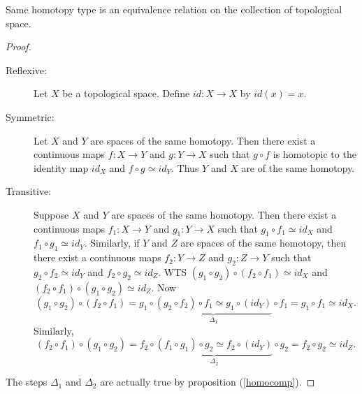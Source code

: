 \begin{prop}
Same homotopy type is an equivalence relation on the collection of topological space.
\end{prop}

\begin{proof}
\begin{description}
  \item[Reflexive:] Let $X$ be a topological space. Define $id:X\rightarrow X$ by $id(x)=x.$
  \item[Symmetric:] Let $X $ and $Y$ are spaces of the same homotopy. Then there exist a continuous maps $f:X\rightarrow Y$ and $g:Y\rightarrow X$ such that $g\circ f $ is homotopic to the identity map $id_X$ and $f\circ g\simeq id_Y$. Thus $Y$ and $X$ are of the same homotopy.
  \item[Transitive:] Suppose $X $ and $Y$ are spaces of the same homotopy. Then there exist a continuous maps $f_1:X\rightarrow Y$ and $g_1:Y\rightarrow X$ such that $g_1\circ f_1 \simeq id_X$ and $f_1\circ g_1\simeq id_Y$. Similarly, if $Y $ and $Z$ are spaces of the same homotopy, then there exist a continuous maps $f_2:Y\rightarrow Z$ and $g_2:Z\rightarrow Y$ such that $g_2\circ f_2 \simeq id_Y$ and $f_2\circ g_2\simeq id_Z$. WTS $(g_1\circ g_2)\circ(f_2\circ f_1)\simeq id_X$ and $(f_2\circ f_1)\circ(g_1\circ g_2)\simeq id_Z$. Now
   $$(g_1\circ g_2)\circ(f_2\circ f_1)=g_1\circ \underbrace{(g_2\circ f_2)\circ f_1 \simeq g_1\circ (id_Y)}_{\Delta_1}\circ f_1= g_1\circ f_1\simeq id_X.$$
Similarly, $$(f_2\circ f_1)\circ(g_1\circ g_2)=f_2\circ \underbrace{(f_1\circ g_1)\circ g_2 \simeq f_2\circ (id_Y)}_{\Delta_2}\circ g_2= f_2\circ g_2\simeq id_Z.$$
\end{description}
The steps $\Delta_1$ and $\Delta_2$ are actually true by proposition (\ref{homocomp}).
\end{proof}

